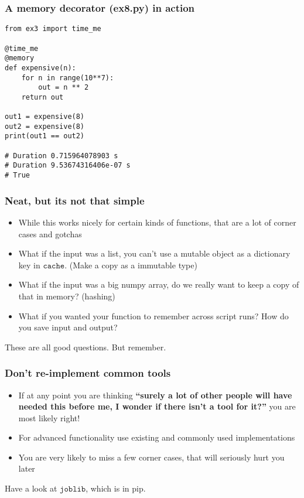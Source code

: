\documentclass{beamer}
\begin{document}
\begin{frame}[fragile]
  \frametitle{A memory decorator (ex8.py) in action}
\begin{verbatim}
from ex3 import time_me

@time_me
@memory
def expensive(n):
    for n in range(10**7):
        out = n ** 2
    return out

out1 = expensive(8)
out2 = expensive(8)
print(out1 == out2)

# Duration 0.715964078903 s
# Duration 9.53674316406e-07 s
# True
\end{verbatim}
\end{frame}

\begin{frame}
  \frametitle{Neat, but its not that simple}
  \begin{itemize}
  \item While this works nicely for certain kinds of functions, that are a lot
    of corner cases and gotchas
  \item What if the input was a list, you can't use a mutable object as a
    dictionary key in $\texttt{cache}$. (Make a copy as a immutable type)
  \item What if the input was a big numpy array, do we really want to keep a
    copy of that in memory? (hashing)
  \item What if you wanted your function to remember across script runs? How
    do you save input and output?
  \end{itemize}
\begin{alertblock}{\vspace*{-3ex}}
  These are all good questions. But remember.
\end{alertblock}
\end{frame}

\begin{frame}
  \frametitle{Don't re-implement common tools}
  \begin{itemize}
  \item If at any point you are thinking \textbf{``surely a lot of
      other people will have needed this before me, I wonder if there
      isn't a tool for it?''} you are most likely right!
  \item {\color{darkred}For advanced functionality use existing and
      commonly used implementations}
  \item {\color{black}}You are very likely to miss a few corner cases,
    that will seriously hurt you later
  \end{itemize}
  \begin{block}{\vspace*{-3ex}}
    Have a look at $\texttt{joblib}$, which is in pip.
  \end{block}
\end{frame}
\end{document}
